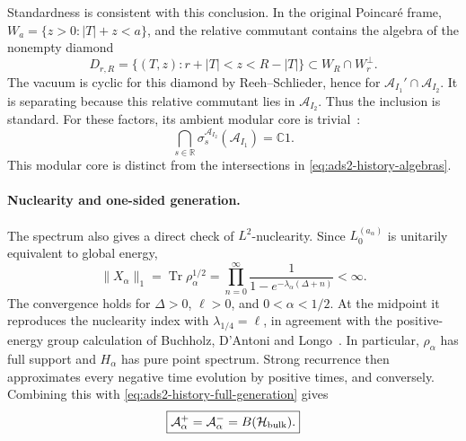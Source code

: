 \documentclass[a4paper,11pt]{article}
\theoremstyle{definition}
\begin{document}
Standardness is consistent with this conclusion. In the original
Poincar\'e frame, $W_a=\{z>0:|T|+z<a\}$, and the relative commutant
contains the algebra of the nonempty diamond
\begin{equation}
 D_{r,R}=\{(T,z):r+|T|<z<R-|T|\}
 \subset W_R\cap W_r^\perp .
\end{equation}
The vacuum is cyclic for this diamond by Reeh--Schlieder, hence for
$\mathcal A_{I_1}'\cap\mathcal A_{I_2}$. It is separating because this
relative commutant lies in $\mathcal A_{I_2}$. Thus the inclusion is
standard. For these factors, its ambient modular core is
trivial~\cite{companionQEC}:
\begin{equation}
 \bigcap_{s\in\mathbb R}
 \sigma_s^{\mathcal A_{I_2}}(\mathcal A_{I_1})=\mathbb C1.
 \label{eq:ads2-history-modular-core}
\end{equation}
This modular core is distinct from the intersections in
\eqref{eq:ads2-history-algebras}.

\paragraph{Nuclearity and one-sided generation.}
The spectrum also gives a direct check of $L^2$-nuclearity. Since
$L_0^{(a_\alpha)}$ is unitarily equivalent to global energy,
\begin{equation}
 \|X_\alpha\|_1
 =\operatorname{Tr}\rho_\alpha^{1/2}
 =\prod_{n=0}^\infty
   \frac{1}{1-e^{-\lambda_\alpha(\Delta+n)}}<\infty.
 \label{eq:ads2-history-nuclearity}
\end{equation}
The convergence holds for $\Delta>0$, $\ell>0$, and
$0<\alpha<1/2$. At the midpoint it reproduces the nuclearity index
with $\lambda_{1/4}=\ell$, in agreement with the positive-energy
group calculation of Buchholz, D'Antoni and Longo~\cite{BDL2007}.
In particular, $\rho_\alpha$ has full support and $H_\alpha$ has pure
point spectrum. Strong recurrence then approximates every negative
time evolution by positive times, and conversely. Combining this
with \eqref{eq:ads2-history-full-generation} gives
\begin{equation}
 \boxed{
 \mathcal A_\alpha^+
 =\mathcal A_\alpha^-
 =B(\mathcal H_{\rm bulk}).
 }
 \label{eq:ads2-history-one-sided-generation}
\end{equation}
\end{document}
